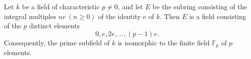 Let $k$ be a field of characteristic $p \neq 0$, and let $E$ be the subring consisting of the integral multiples $ne \ (n \ge 0)$ of the identity $e$ of $k$. Then $E$ is a field consisting of the $p$ distinct elements
$$
0, e, 2e, \dots, (p-1)e.
$$
Consequently, the prime subfield of $k$ is isomorphic to the finite field $\mathbb{F}_p$ of $p$ elements.
